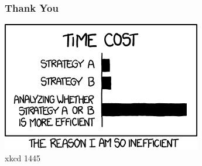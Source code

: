 \begin{frame}
	\frametitle{Thank You}
	\vspace{1cm}
	\centering
	\includegraphics{efficiency} \\
	xkcd 1445
\end{frame}






